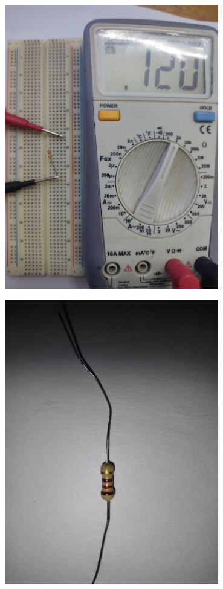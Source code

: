 \documentclass[12pt]{article}
\begin{document}
\begin{minipage}{0.45\textwidth}
    \centering
    \includegraphics[width=0.7\textwidth]{Res2.1.jpg}
\end{minipage}\hspace{30pt}
\begin{minipage}{0.45\textwidth}
    \centering
    \includegraphics[angle=180, width=0.7\textwidth]{Res2.2.jpg}
\end{minipage}
\end{document}
